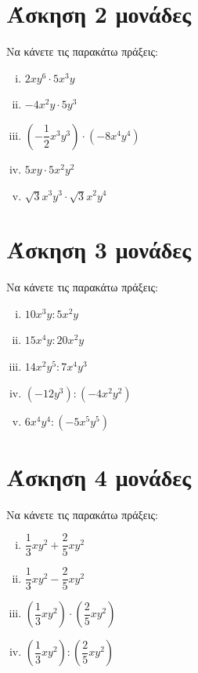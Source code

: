 \documentclass[a4paper,10pt]{report}
\begin{document}
\section*{Άσκηση 2  \hfill \small{ μονάδες}}
Να κάνετε τις παρακάτω πράξεις:
\begin{enumerate}[i)]
 \item $2xy^{6} \cdot 5x^{3}y$
 \item $-4x^{2}y \cdot 5y^{3}$
 \item $(-\dfrac{1}{2}x^{3}y^{3})\cdot (-8x^{4}y^{4})$
 \item $5xy \cdot 5x^{2}y^{2}$ 
 \item $\sqrt{3}x^{3}y^{3} \cdot \sqrt{3}x^{2}y^{4}$
\end{enumerate}









\section*{Άσκηση 3  \hfill \small{ μονάδες}}
Να κάνετε τις παρακάτω πράξεις:
\begin{enumerate}[i)]
 \item $10x^{3}y : 5x^{2}y$
 \item $15x^{4}y : 20x^{2}y$
 \item $14x^{2}y^{5} : 7x^{4}y^{3}$
 \item $(-12y^{3}) : (-4x^{2}y^{2})$
 \item $6x^{4}y^{4} : (-5x^{5}y^{5})$
\end{enumerate}



\section*{Άσκηση 4  \hfill \small{ μονάδες}}
Να κάνετε τις παρακάτω πράξεις:
\begin{enumerate}[i)]
 \item $\dfrac{1}{3}xy^{2}+\dfrac{2}{5}xy^{2}$
 \item $\dfrac{1}{3}xy^{2}-\dfrac{2}{5}xy^{2}$
 \item $(\dfrac{1}{3}xy^{2}) \cdot (\dfrac{2}{5}xy^{2})$
 \item $(\dfrac{1}{3}xy^{2}) : (\dfrac{2}{5}xy^{2})$
\end{enumerate}





 









\end{document}
